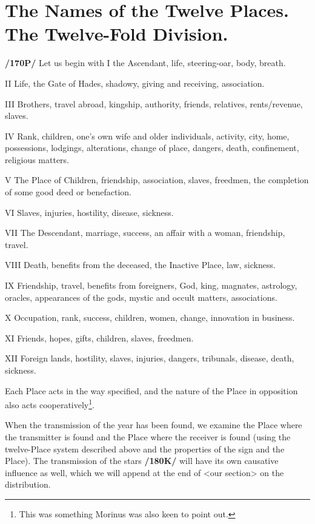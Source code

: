 \section{The Names of the Twelve Places. The Twelve-Fold Division.}

\textbf{/170P/} Let us begin with I the Ascendant, life, steering-oar, body, breath. 

II Life, the Gate of Hades, shadowy, giving and receiving, association.

III Brothers, travel abroad, kingship, authority, friends, relatives, rents/revenue, slaves.

IV Rank, children, one’s own wife and older individuals, activity, city, home, possessions, lodgings, alterations, change of place, dangers, death, confinement, religious matters.

V The Place of Children, friendship, association, slaves, freedmen, the completion of some good deed or benefaction.

VI Slaves, injuries, hostility, disease, sickness.

VII The Descendant, marriage, success, an affair with a woman, friendship, travel.

VIII Death, benefits from the deceased, the Inactive Place, law, sickness.

IX Friendship, travel, benefits from foreigners, God, king, magnates, astrology, oracles, appearances of the gods, mystic and occult matters, associations.

X Occupation, rank, success, children, women, change, innovation in business.

XI Friends, hopes, gifts, children, slaves, freedmen.

XII Foreign lands, hostility, slaves, injuries, dangers, tribunals, disease, death, sickness.

Each Place acts in the way specified, and the nature of the Place in opposition also acts cooperatively\footnote{This was something Morinus was also keen to point out.}.

When the transmission of the year has been found, we examine the Place where the transmitter is found and the Place where the receiver is found (using the twelve-Place system described above and the properties of the sign and the Place). The transmission of the stars \textbf{/180K/} will have its own causative influence as well, which we will append at the end of <our section> on the distribution.

